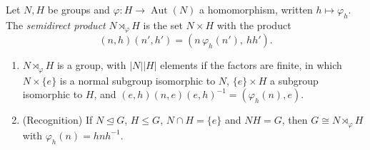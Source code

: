\begin{definition}
Let $N,H$ be groups and $\varphi:H\to\operatorname{Aut}(N)$ a homomorphism, written $h\mapsto\varphi_h$. The \emph{semidirect product} $N\rtimes_\varphi H$ is the set $N\times H$ with the product
\[
(n,h)(n',h')=(n\,\varphi_h(n'),\ hh').
\]
\end{definition}

\begin{proposition}\label{prop:semidirect}
\begin{enumerate}[label=(\alph*)]
\item $N\rtimes_\varphi H$ is a group, with $|N||H|$ elements if the factors are finite, in which $N\times\{e\}$ is a normal subgroup isomorphic to $N$, $\{e\}\times H$ a subgroup isomorphic to $H$, and $(e,h)(n,e)(e,h)^{-1}=(\varphi_h(n),e)$.
\item (Recognition) If $N\trianglelefteq G$, $H\le G$, $N\cap H=\{e\}$ and $NH=G$, then $G\cong N\rtimes_\varphi H$ with $\varphi_h(n)=hnh^{-1}$.
\end{enumerate}
\end{proposition}

